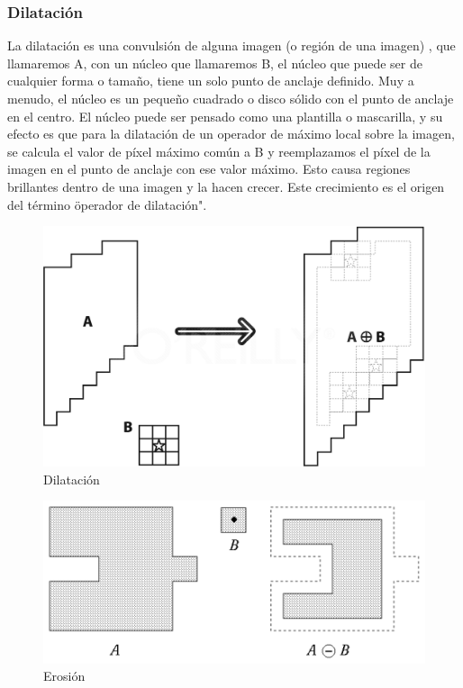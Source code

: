\subsubsection{Dilatación}
La dilatación es una convulsión de alguna imagen (o región de una imagen) , que llamaremos A, con un núcleo que llamaremos B,
el núcleo que puede ser de cualquier forma o tamaño, tiene un solo punto de anclaje definido. Muy  a menudo, el núcleo es un
pequeño cuadrado o disco sólido con el punto de anclaje en el centro. El núcleo puede ser pensado como una plantilla  o
mascarilla, y su efecto es que para la dilatación de un operador de máximo local sobre la imagen, se calcula el valor de píxel
máximo común a B y reemplazamos el píxel de la imagen en el punto de anclaje con ese valor máximo. Esto causa regiones brillantes
dentro de una imagen y la hacen crecer. Este crecimiento es el origen del término \" operador de dilatación". \cite{BookOpenCv}

\begin{figure}[hbtp]

\centering
\includegraphics[scale=0.3]{imagenes/erosion-model.png}
\caption{Dilatación}
\end{figure}
\begin{figure}[hbtp]
\label{fig:erosion}
\centering
\includegraphics[scale=1]{imagenes/erosion.png}
\caption{Erosión}
\end{figure}


